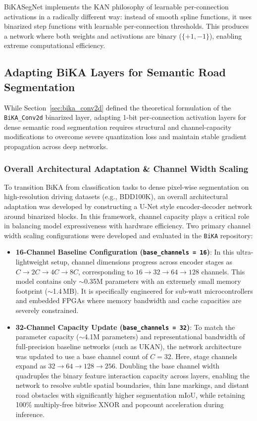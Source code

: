 \documentclass[a4paper]{report}
\begin{document}
BiKASegNet implements the KAN philosophy of learnable per-connection activations in a radically different way: instead of smooth spline functions, it uses binarized step functions with learnable per-connection thresholds. This produces a network where both weights and activations are binary ($\{+1, -1\}$), enabling extreme computational efficiency.

\subsection{Adapting BiKA Layers for Semantic Road Segmentation}
\label{sec:bika_adapting_layers}
While Section~\ref{sec:bika_conv2d} defined the theoretical formulation of the \texttt{BiKA\_Conv2d} binarized layer, adapting 1-bit per-connection activation layers for dense semantic road segmentation requires structural and channel-capacity modifications to overcome severe quantization loss and maintain stable gradient propagation across deep networks.

\subsubsection{Overall Architectural Adaptation \& Channel Width Scaling}
To transition BiKA from classification tasks to dense pixel-wise segmentation on high-resolution driving datasets (e.g., BDD100K), an overall architectural adaptation was developed by constructing a U-Net style encoder-decoder network around binarized blocks. In this framework, channel capacity plays a critical role in balancing model expressiveness with hardware efficiency. Two primary channel width scaling configurations were developed and evaluated in the \texttt{BiKA} repository:

\begin{itemize}
    \item \textbf{16-Channel Baseline Configuration (\texttt{base\_channels = 16})}:
    In this ultra-lightweight setup, channel dimensions progress across encoder stages as $C \rightarrow 2C \rightarrow 4C \rightarrow 8C$, corresponding to $16 \rightarrow 32 \rightarrow 64 \rightarrow 128$ channels. This model contains only $\sim$0.35M parameters with an extremely small memory footprint ($\sim$1.4\,MB). It is specifically engineered for sub-watt microcontrollers and embedded FPGAs where memory bandwidth and cache capacities are severely constrained.
    
    \item \textbf{32-Channel Capacity Update (\texttt{base\_channels = 32})}:
    To match the parameter capacity ($\sim$4.1M parameters) and representational bandwidth of full-precision baseline networks (such as UKAN), the network architecture was updated to use a base channel count of $C = 32$. Here, stage channels expand as $32 \rightarrow 64 \rightarrow 128 \rightarrow 256$. Doubling the base channel width quadruples the binary feature interaction capacity across layers, enabling the network to resolve subtle spatial boundaries, thin lane markings, and distant road obstacles with significantly higher segmentation mIoU, while retaining 100\% multiply-free bitwise XNOR and popcount acceleration during inference.
\end{itemize}
\end{document}
